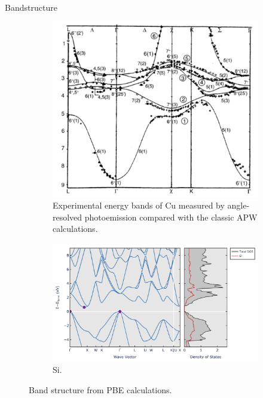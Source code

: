 \documentclass[aspectratio=169]{beamer}
\begin{document}
\begin{frame}{Bandstructure}
\begin{figure}
    \centering
    \begin{subfigure}{0.45\textwidth}
        \centering
        \includegraphics[width=0.8\linewidth]{lectures/figures/8_Bandstructure_Cu.png}
    \caption{Experimental energy bands of Cu measured by angle-resolved photoemission compared with the classic APW calculations.\cite{martinElectronicStructureBasic2004}}
    \end{subfigure}
    \begin{subfigure}{0.5\textwidth}
        \centering
        \includegraphics[width=\linewidth]{lectures/figures/8_Bandstructure_Si.png}
    \caption{Si.\cite{jainCommentaryMaterialsProject2013}}
    \end{subfigure}
    \caption{Band structure from PBE calculations.}
    \label{fig}
\end{figure} 
\end{frame} 
\end{document}

